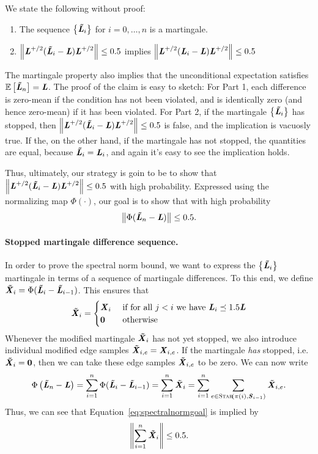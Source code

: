 We state the following without proof:
\begin{claim}
\noindent
  \begin{enumerate}
  \item The sequence $\left\{\boldsymbol{\mathit{\tilde{L}}}_i \right\}$ for $i = 0, \ldots, n$ is a
    martingale.
  \item $\left\| \boldsymbol{\mathit{L}}^{+/2} (\boldsymbol{\mathit{\tilde{L}}}_i -  \boldsymbol{\mathit{L}}) \boldsymbol{\mathit{L}}^{+/2} \right\| \leq 0.5$
    implies $\left\| \boldsymbol{\mathit{L}}^{+/2} (\boldsymbol{\mathit{L}}_i -  \boldsymbol{\mathit{L}}) \boldsymbol{\mathit{L}}^{+/2} \right\| \leq 0.5$
  \end{enumerate}
\end{claim}
The martingale property also implies that the unconditional
expectation satisfies $\mathop{{}\mathbb{E}}\left[\boldsymbol{\mathit{\tilde{L}}}_n\right] = \boldsymbol{\mathit{L}}$.
The proof of the claim is easy to sketch: For Part 1, each difference is
zero-mean if the condition has not been violated, and is identically
zero (and hence zero-mean) if it has been violated.
For Part 2, if the martingale $\left\{\boldsymbol{\mathit{\tilde{L}}}_i \right\}$ has stopped,
then $\left\| \boldsymbol{\mathit{L}}^{+/2}
  (\boldsymbol{\mathit{\tilde{L}}}_i -  \boldsymbol{\mathit{L}}) \boldsymbol{\mathit{L}}^{+/2} \right\| \leq 0.5$ is false, and the implication
is vacuosly true.
If the, on the other hand, if the martingale has not stopped, the
quantities are equal, because $\boldsymbol{\mathit{\tilde{L}}}_i  = \boldsymbol{\mathit{L}}_i$, and again it's easy
to see the implication holds.

Thus, ultimately, our strategy is goin to be to show that
$\left\| \boldsymbol{\mathit{L}}^{+/2} (\boldsymbol{\mathit{\tilde{L}}}_i -  \boldsymbol{\mathit{L}}) \boldsymbol{\mathit{L}}^{+/2} \right\| \leq 0.5$
with high probability.
Expressed using the normalizing map $\Phi(\cdot)$,
our goal is to show that with high probability
\[
  \left\| \Phi(\boldsymbol{\mathit{\tilde{L}}}_n -  \boldsymbol{\mathit{L}}) \right\| \leq 0.5.
\]

\paragraph{Stopped martingale difference sequence.}
In order to prove the spectral norm bound, we want to express the
$\left\{\boldsymbol{\mathit{\tilde{L}}}_i \right\}$ martingale in terms of a sequence of martingale
differences.
To this end, we define
$\boldsymbol{\mathit{\tilde{X}}}_i = \Phi(\boldsymbol{\mathit{\tilde{L}}}_i -  \boldsymbol{\mathit{\tilde{L}}}_{i-1})$.
This ensures that
\begin{equation}
  \label{eq:stoppedmartingale}
  \boldsymbol{\mathit{\tilde{X}}}_i
  =
  \begin{cases}
    \boldsymbol{\mathit{X}}_i& \text{ if for all } j < i \text{ we have }
       \boldsymbol{\mathit{L}}_i \preceq 1.5 \boldsymbol{\mathit{L}}
       \\
    \boldsymbol{0} & \text{ otherwise }
  \end{cases}
\end{equation}
Whenever the modified martingale $\boldsymbol{\mathit{\tilde{X}}}_i$ has not yet stopped, we
also introduce individual modified edge samples $\boldsymbol{\mathit{\tilde{X}}}_{i,e} =
\boldsymbol{\mathit{X}}_{i,e}$.
If the martingale \emph{has} stopped, i.e. $\boldsymbol{\mathit{\tilde{X}}}_i = \boldsymbol{0}$,
then we can take these edge samples $\boldsymbol{\mathit{\tilde{X}}}_{i,e}$
to be zero.
We can now write
\[
  \Phi\left(  \boldsymbol{\mathit{\tilde{L}}}_n -\boldsymbol{\mathit{L}} \right)
  =
    \sum_{i=1}^n \Phi(\boldsymbol{\mathit{\tilde{L}}}_i - \boldsymbol{\mathit{\tilde{L}}}_{i-1})
  =
  \sum_{i=1}^n \boldsymbol{\mathit{\tilde{X}}}_i
  =
  \sum_{i=1}^n \sum_{e \in
    \textsc{Star}\!\left({\pi(i),\boldsymbol{\mathit{S}}_{i-1}}\right)}\boldsymbol{\mathit{\tilde{X}}}_{i,e}
  .
\]
Thus, we can see that Equation~\eqref{eq:spectralnormgoal} is implied by
\begin{equation}
  \label{eq:zeromeanspectralnormgoal}
  \left\| \sum_{i=1}^n \boldsymbol{\mathit{\tilde{X}}}_i \right\| \leq 0.5.
\end{equation}


